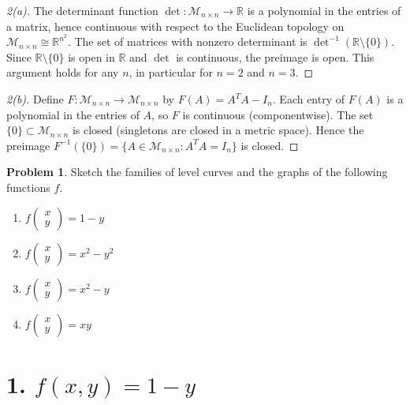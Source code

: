 \documentclass[11pt,a4paper]{article}
\theoremstyle{definition}
\newtheorem{problem}[definition]{Problem}
\theoremstyle{plain}
\begin{document}
\begin{proof}[2(a)]
	The determinant function \(\det : \mathcal{M}_{n\times n} \to \mathbb{R}\) is a polynomial in the entries of a matrix, hence continuous with respect to the Euclidean topology on \(\mathcal{M}_{n\times n} \cong \mathbb{R}^{n^2}\). The set of matrices with nonzero determinant is \(\det^{-1}(\mathbb{R}\setminus\{0\})\). Since \(\mathbb{R}\setminus\{0\}\) is open in \(\mathbb{R}\) and \(\det\) is continuous, the preimage is open. This argument holds for any \(n\), in particular for \(n=2\) and \(n=3\).
\end{proof}

\begin{proof}[2(b)]
	Define \(F : \mathcal{M}_{n\times n} \to \mathcal{M}_{n\times n}\) by \(F(A) = A^T A - I_n\). Each entry of \(F(A)\) is a polynomial in the entries of \(A\), so \(F\) is continuous (componentwise). The set \(\{0\} \subset \mathcal{M}_{n\times n}\) is closed (singletons are closed in a metric space). Hence the preimage \(F^{-1}(\{0\}) = \{A \in \mathcal{M}_{n\times n} : A^T A = I_n\}\) is closed.
\end{proof}

\begin{problem}
Sketch the families of level curves and the graphs of the following functions $f$.
\begin{enumerate}
	\item $f \begin{pmatrix} x \\ y \end{pmatrix} = 1-y$
	\item $f \begin{pmatrix} x \\ y \end{pmatrix} = x^2 - y^2$
	\item $f \begin{pmatrix} x \\ y \end{pmatrix} = x^2-y$
	\item $f \begin{pmatrix} x \\ y \end{pmatrix} = xy$
\end{enumerate}
\end{problem}
\section*{1. \(f(x,y)=1-y\)}
\end{document}
